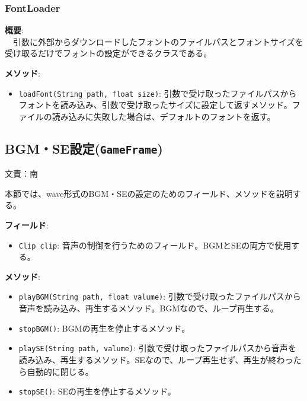 \documentclass[11pt,a4j]{jarticle}
\begin{document}
\subsubsection{FontLoader}
\noindent\textbf{概要}: \\
　引数に外部からダウンロードしたフォントのファイルパスとフォントサイズを受け取るだけでフォントの設定ができるクラスである。

\noindent\textbf{メソッド}:
\begin{itemize}
    \item \texttt{loadFont(String path, float size)}: 引数で受け取ったファイルパスからフォントを読み込み、引数で受け取ったサイズに設定して返すメソッド。ファイルの読み込みに失敗した場合は、デフォルトのフォントを返す。
\end{itemize}


\subsection{BGM・SE設定(\texttt{GameFrame})}
\begin{flushright}
  文責：南
\end{flushright}
本節では、wave形式のBGM・SEの設定のためのフィールド、メソッドを説明する。

\noindent\textbf{フィールド}:
\begin{itemize}
    \item \texttt{Clip clip}: 音声の制御を行うためのフィールド。BGMとSEの両方で使用する。
\end{itemize}

\noindent\textbf{メソッド}:
\begin{itemize}
    \item \texttt{playBGM(String path, float valume)}: 引数で受け取ったファイルパスから音声を読み込み、再生するメソッド。BGMなので、ループ再生する。
    \item \texttt{stopBGM()}: BGMの再生を停止するメソッド。
    \item \texttt{playSE(String path, valume)}: 引数で受け取ったファイルパスから音声を読み込み、再生するメソッド。SEなので、ループ再生せず、再生が終わったら自動的に閉じる。
    \item \texttt{stopSE()}: SEの再生を停止するメソッド。
\end{itemize}
\clearpage
\end{document}
